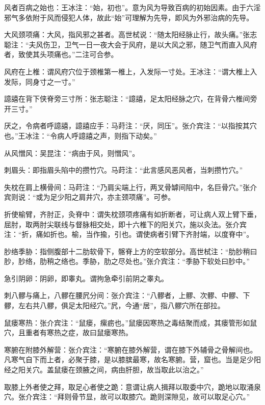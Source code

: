 \documentclass[12pt]{ctexbook}%
\begin{document}
\begin{jiaozhu}
	\item 风者百病之始也：王冰注：“始，初也”。意为风为导致百病的初始因素。由于六淫邪气多依附于风而侵犯人体，故此“始”可理解为先导，即风为外邪治病的先导。
	\item 大风颈项痛：大风，指风邪之甚者。高世栻说：“随太阳经脉止行，故头痛。”张志聪注：“夫风伤卫，卫气一日一夜大会于风府，是以大风之邪，随卫气而直入风府者，致使其头项痛也。”二注可合参。
	\item 风府在上椎：谓风府穴位于颈椎第一椎上，入发际一寸处。王冰注：“谓大椎上入发际，同身寸之一寸。”
	\item 譩譆在背下侠脊旁三寸所：张志聪注：“譩譆，足太阳经脉之穴，在背骨六椎间旁开三寸。”
	\item 厌之，令病者呼譩譆，譩譆应手：马莳注：“厌，同压”。张介宾注：“以指按其穴也。”王冰注：“令病人呼譩譆之声，则指下动矣。”
	\item 从风憎风：吴昆注：“病由于风，则憎风”。
	\item 刺眉头：即指眉头陷中的攒竹穴。马莳注：“此言感风恶风者，当刺攒竹穴。”
	\item 失枕在肩上横骨间：马莳注：“乃肩尖端上行，两叉骨罅间陷中，名巨骨穴。”张介宾则说：“或为足少阳之肩井穴，亦主颈项痛”。可参。
	\item 折使榆臂，齐肘正，灸脊中：谓失枕颈项疼痛有如折断者，可让病人双上臂下垂，屈肘，取两肘尖联线与督脉相交处，即十六椎下的阳关穴，施以灸法。张介宾注：“折，痛如折也。榆，当作揄，引也。谓使病者引臂下齐肘端，以度脊中”。
	\item 䏚络季胁：指侧腹部十二肋软骨下，髂脊上方的空软部分。高世栻注：“肋䏚稍曰䏚，䏚络，肋稍之络也。季胁，肋之尽处也。”张介宾注：“季胁下软处曰䏚中。”
	\item 急引阴卵：阴卵，即睾丸。谓拘急牵引前阴之睾丸。
	\item 刺八髎与痛上，八髎在腰凥分间：张介宾注：“八髎者，上髎、次髎、中髎、下髎，左右共八髎，俱足太阳经穴。”凥，今通“居”，指八髎穴所在部拉。
	\item 鼠瘘寒热：张介宾注：“鼠瘘，瘰疬也。”鼠瘘因寒热之毒结聚而成，其瘘管形如鼠穴，且重者有寒热之症，故曰鼠瘘寒热。
	\item 寒腑在附膝外解营：张介宾注：“寒腑在膝外解营，谓在膝下外辅骨之骨解间也。凡寒气自下而上者，必聚于膝，是以膝膑最寒，故名寒腑。营，窟也。当是足少阳经之阳关穴。盖鼠瘘在颈腋之间，病由肝胆，故当取此以治之。”
	\item 取膝上外者使之拜，取足心者使之跪：意谓让病人揖拜以取委中穴，跪地以取涌泉穴。张介宾注：“拜则骨节显，故可以取膝穴。跪则深隙见，故可以取足心穴。”
\end{jiaozhu}
\end{document}
